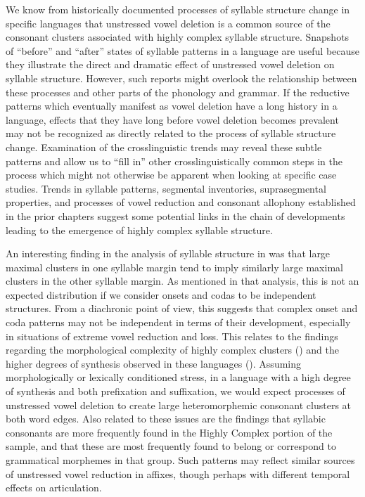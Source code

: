   We know from historically documented processes of syllable structure change in specific languages that unstressed vowel deletion is a common source of the consonant clusters associated with highly complex syllable structure. Snapshots of ``before'' and ``after'' states of syllable patterns in a language are useful because they illustrate the direct and dramatic effect of unstressed vowel deletion on syllable structure. However, such reports might overlook the relationship between these processes and other parts of the phonology and grammar. If the reductive patterns which eventually manifest as vowel deletion have a long history in a language, effects that they have long before vowel deletion becomes prevalent may not be recognized as directly related to the process of syllable structure change. Examination of the crosslinguistic trends may reveal these subtle patterns and allow us to ``fill in'' other crosslinguistically common steps in the process which might not otherwise be apparent when looking at specific case studies. Trends in syllable patterns, segmental inventories, suprasegmental properties, and processes of vowel reduction and consonant allophony established in the prior chapters suggest some potential links in the chain of developments leading to the emergence of highly complex syllable structure.

  An interesting finding in the analysis of syllable structure in  was that large maximal clusters in one syllable margin tend to imply similarly large maximal clusters in the other syllable margin. As mentioned in that analysis, this is not an expected distribution if we consider onsets and codas to be independent structures. From a diachronic point of view, this suggests that complex onset and coda patterns may not be independent in terms of their development, especially in situations of extreme vowel reduction and loss. This relates to the findings regarding the morphological complexity of highly complex clusters () and the higher degrees of synthesis observed in these languages (). Assuming morphologically or lexically conditioned stress, in a language with a high degree of synthesis and both prefixation and suffixation, we would expect processes of unstressed vowel deletion to create large heteromorphemic consonant clusters at both word edges. Also related to these issues are the findings that syllabic consonants are more frequently found in the Highly Complex portion of the sample, and that these are most frequently found to belong or correspond to grammatical morphemes in that group. Such patterns may reflect similar sources of unstressed vowel reduction in affixes, though perhaps with different temporal effects on articulation.

